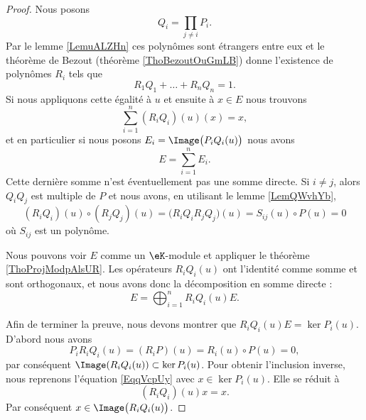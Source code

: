 \begin{proof}
    Nous posons 
    \begin{equation}
        Q_i=\prod_{j\neq i}P_i.
    \end{equation}
    Par le lemme \ref{LemuALZHn} ces polynômes sont étrangers entre eux et le théorème de Bezout (théorème \ref{ThoBezoutOuGmLB}) donne l'existence de polynômes \( R_i\) tels que
    \begin{equation}
        R_1Q_1+\ldots+R_nQ_n=1.
    \end{equation}
    Si nous appliquons cette égalité à \( u\) et ensuite à \( x\in E\) nous trouvons
    \begin{equation}        \label{EqqVcpUy}
        \sum_{i=1}^n(R_iQ_i)(u)(x)=x,
    \end{equation}
    et en particulier si nous posons \( E_i=\Image\big(P_iQ_i(u)\big)\) nous avons
    \begin{equation}
        E=\sum_{i=1}^nE_i.
    \end{equation}
    Cette dernière somme n'est éventuellement pas une somme directe. Si \( i\neq j\), alors \( Q_iQ_j\) est multiple de \( P\) et nous avons, en utilisant le lemme \ref{LemQWvhYb}, 
    \begin{equation}
        (R_iQ_i)(u)\circ (R_jQ_j)(u)=\big( R_iQ_iR_jQ_j \big)(u)=S_{ij}(u)\circ P(u)=0
    \end{equation}
    où \( S_{ij}\) est un polynôme. 

    Nous pouvons voir \( E\) comme un \( \eK\)-module et appliquer le théorème \ref{ThoProjModpAlsUR}. Les opérateurs \( R_iQ_i(u)\) ont l'identité comme somme et sont orthogonaux, et nous avons donc la décomposition en somme directe :
    \begin{equation}
        E=\bigoplus_{i=1}^nR_iQ_i(u)E.
    \end{equation}

    Afin de terminer la preuve, nous devons montrer que \( R_iQ_i(u)E=\ker P_i(u)\). D'abord nous avons
    \begin{equation}
        P_iR_iQ_i(u)=(R_iP)(u)=R_i(u)\circ P(u)=0,
    \end{equation}
    par conséquent \( \Image(R_iQ_i(u))\subset \ker P_i(u)\). Pour obtenir l'inclusion inverse, nous reprenons l'équation \eqref{EqqVcpUy} avec \( x\in\ker P_i(u)\). Elle se réduit à
    \begin{equation}
        (R_iQ_i)(u)x=x.
    \end{equation}
    Par conséquent \( x\in\Image\big( R_iQ_i(u) \big)\).
\end{proof}

